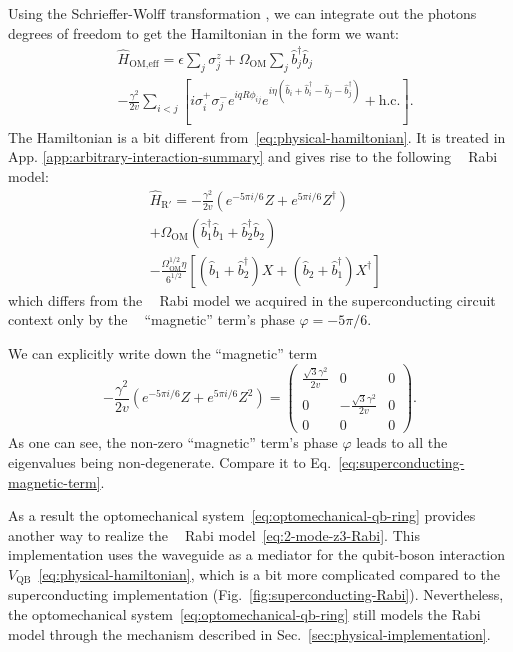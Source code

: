 \documentclass[reprint, aps, prx, amsmath, amssymb, longbibliography, superscriptaddress]{revtex4-2}
\DeclareMathOperator{\Zthree}{\mathbb{Z}_3}
\begin{document}
Using the Schrieffer-Wolff transformation \cite{bravyi_schrieffer_2011}, we can integrate out the photons degrees of freedom to get the Hamiltonian in the form we want:
\begin{equation}
\begin{aligned}
&\hat{H}_{\text{OM,eff}}=  \epsilon \sum_j \sigma_j^z + \Omega_{\text{OM}} \sum_j \hat{b}_j^{\dagger} \hat{b}_j \\
& -\frac{\gamma^2}{2v} \sum_{i<j}\left[i \sigma_i^{+} \sigma_j^- e^{i q R \phi_{i j}} e^{i \eta\left(\hat{b}_i+\hat{b}_i^{\dagger}-\hat{b}_j-\hat{b}_j^{\dagger}\right)}+\text {h.c.}\right].
\end{aligned}
\end{equation}
The Hamiltonian is a bit different from~\eqref{eq:physical-hamiltonian}. It is treated in App. \ref{app:arbitrary-interaction-summary} and gives rise to the following $\Zthree$ Rabi model:
\begin{equation}
\begin{aligned}
    &\hat H_{\text{R}'}= - \frac{\gamma^2}{2v} (e^{-5\pi i/6} Z + e^{5\pi i/6} Z^{\dagger}) \\
    &+ \Omega_{\text{OM}} (\hat b_1^{\dagger} \hat b_1 + \hat b_2^{\dagger} \hat b_2) \\
    &- \frac{\Omega_{\text{OM}}^{1/2} \eta}{6^{1/2}}\left[(\hat b_1 + \hat b_2^{\dagger}) X  + (\hat b_2 + \hat b_1^{\dagger}) X^{\dagger}  \right]
\end{aligned}
\end{equation}
which differs from the $\Zthree $ Rabi model we acquired in the superconducting circuit context only by the $\Zthree$ ``magnetic'' term's phase $\varphi = - 5\pi/6$.

We can explicitly write down the ``magnetic'' term
\begin{equation}
    - \frac{\gamma^2}{2v} (e^{-5\pi i/6} Z + e^{5\pi i/6} Z^2) = \begin{pmatrix}
        \frac{\sqrt{3}\gamma^2}{2v} & 0 & 0 \\ 0 & -\frac{\sqrt{3}\gamma^2}{2v} & 0 \\ 0 & 0 & 0 
    \end{pmatrix}.
\end{equation}
As one can see, the non-zero ``magnetic'' term's phase $\varphi$ leads to all the eigenvalues being non-degenerate. Compare it to Eq.~\eqref{eq:superconducting-magnetic-term}.

As a result the optomechanical system~\eqref{eq:optomechanical-qb-ring} provides another way to realize the $\Zthree$ Rabi model~\eqref{eq:2-mode-z3-Rabi}. This implementation uses the waveguide as a mediator for the qubit-boson interaction $V_{\text{QB}}$~\eqref{eq:physical-hamiltonian}, which is a bit more complicated compared to the superconducting implementation (Fig.~\ref{fig:superconducting-Rabi}). Nevertheless, the optomechanical system~\eqref{eq:optomechanical-qb-ring} still models the Rabi model through the mechanism described in Sec.~\ref{sec:physical-implementation}.
\end{document}
